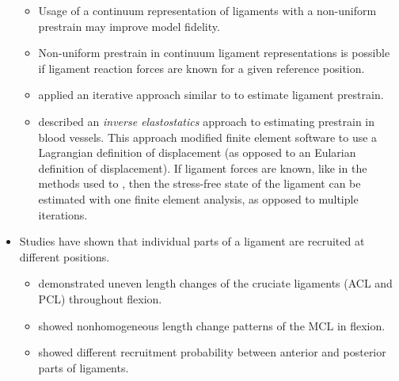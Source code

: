 \documentclass{article}
\begin{document}
\begin{itemize}
\begin{itemize}
        \item Usage of a continuum representation of ligaments with a non-uniform prestrain may improve model fidelity.
        \item Non-uniform prestrain in continuum ligament representations is possible if ligament reaction forces are known for a given reference position. 
        \item \cite{maas_general_2016} applied an iterative approach similar to \cite{sellier_iterative_2011} to estimate ligament prestrain. 
        \item \cite{lu_computational_2007} described an \textit{inverse elastostatics} approach to estimating prestrain in blood vessels. This approach modified finite element software to use a Lagrangian definition of displacement (as opposed to an Eularian definition of displacement). If ligament forces are known, like in the methods used to \cite{maas_general_2016}, then the stress-free state of the ligament can be estimated with one finite element analysis, as opposed to multiple iterations.
    \end{itemize}
    \item Studies have shown that individual parts of a ligament are recruited at different positions.
    \begin{itemize}
        \item \cite{amiri_multiple-bundle_2011} demonstrated uneven length changes of the cruciate ligaments (ACL and PCL) throughout flexion.
        \item \cite{hosseini_vivo_2014,liu_vivo_2011} showed nonhomogeneous length change patterns of the MCL in flexion.
        \item \cite{blankevoort_recruitment_1991} showed different recruitment probability between anterior and posterior parts of ligaments.
    \end{itemize}
    
\end{itemize}
\end{document}
